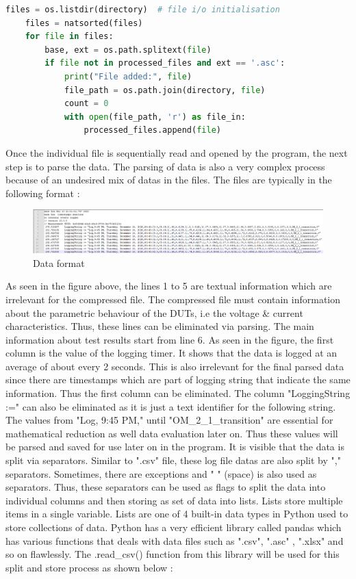 \begin{lstlisting}[language = Python]
    files = os.listdir(directory)  # file i/o initialisation
    files = natsorted(files)
    for file in files:
        base, ext = os.path.splitext(file)
        if file not in processed_files and ext == '.asc':
            print("File added:", file)
            file_path = os.path.join(directory, file)
            count = 0
            with open(file_path, 'r') as file_in:
                processed_files.append(file)
\end{lstlisting}

Once the individual file is sequentially read and opened by the program, the next step is to parse the data. The parsing of data is also a very complex process because of an undesired mix of datas in the files. The files are typically in the following format : 

\begin{figure}
    	\centering
    	\includegraphics[width=1\textwidth]{images/asc.png}
    	\caption [ASCII data]{Data format}  
    	\label{fig:ascii data}
\end{figure}
\clearpage

As seen in the figure above, the lines 1 to 5 are textual information which are irrelevant for the compressed file. The compressed file must contain information about the parametric behaviour of the DUTs, i.e the voltage \& current characteristics. Thus, these lines can be eliminated via parsing. The main information about test results start from line 6. As seen in the figure, the first column is the value of the logging timer. It shows that the data is logged at an average of about every 2 seconds. This is also irrelevant for the final parsed data since there are timestamps which are part of logging string that indicate the same information. Thus the first column can be eliminated. The column "LoggingString :=" can also be eliminated as it is just a text identifier for the following string. The values from "Log, 9:45 PM," until "OM\_2\_1\_transition" are essential for mathematical reduction as well data evaluation later on. Thus these values will be parsed and saved for use later on in the program. It is visible that the data is split via separators. Similar to ".csv" file, these log file datas are also split by "," separators. Sometimes, there are exceptions and " " (space) is also used as separators. Thus, these separators can be used as flags to split the data into individual columns and then storing as set of data into lists. Lists store multiple items in a single variable. Lists are one of 4 built-in data types in Python used to store collections of data. Python has a very efficient library called pandas which has various functions that deals with data files such as ".csv", ".asc" , ".xlsx" and so on flawlessly. The .read\_csv() \cite{Pandas} function from this library will be used for this split and store process as shown below : \\

